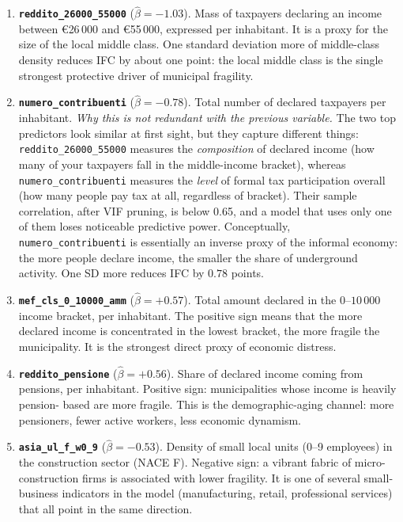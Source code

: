 \documentclass[11pt,a4paper]{article}
\begin{document}
\begin{enumerate}[leftmargin=2em]
  \item \textbf{\texttt{reddito\_26000\_55000}} (\(\hat\beta = -1.03\)).
    Mass of taxpayers declaring an income between
    \euro{26\,000} and \euro{55\,000}, expressed per inhabitant. It
    is a proxy for the size of the local middle class.
    One standard deviation more of middle-class density reduces IFC
    by about one point: the local middle class is the single
    strongest protective driver of municipal fragility.

  \item \textbf{\texttt{numero\_contribuenti}} (\(\hat\beta = -0.78\)).
    Total number of declared taxpayers per inhabitant.
    \emph{Why this is not redundant with the previous variable.} The
    two top predictors look similar at first sight, but they capture
    different things: \texttt{reddito\_26000\_55000} measures the
    \emph{composition} of declared income (how many of your taxpayers
    fall in the middle-income bracket), whereas
    \texttt{numero\_contribuenti} measures the \emph{level} of formal
    tax participation overall (how many people pay tax at all,
    regardless of bracket). Their sample correlation, after VIF
    pruning, is below 0.65, and a model that uses only one of them
    loses noticeable predictive power. Conceptually,
    \texttt{numero\_contribuenti} is essentially an inverse proxy of
    the informal economy: the more people declare income, the smaller
    the share of underground activity. One SD more reduces IFC by
    $0.78$ points.

  \item \textbf{\texttt{mef\_cls\_0\_10000\_amm}} (\(\hat\beta = +0.57\)).
    Total amount declared in the
    \texteuro\(0\)--\texteuro\(10\,000\) income bracket, per
    inhabitant. The positive sign means that the more declared
    income is concentrated in the lowest bracket, the more fragile
    the municipality. It is the strongest direct proxy of economic
    distress.

  \item \textbf{\texttt{reddito\_pensione}} (\(\hat\beta = +0.56\)).
    Share of declared income coming from pensions, per inhabitant.
    Positive sign: municipalities whose income is heavily pension-
    based are more fragile. This is the demographic-aging channel:
    more pensioners, fewer active workers, less economic dynamism.

  \item \textbf{\texttt{asia\_ul\_f\_w0\_9}} (\(\hat\beta = -0.53\)).
    Density of small local units (0--9 employees) in the
    construction sector (NACE F). Negative sign: a vibrant fabric
    of micro-construction firms is associated with lower fragility.
    It is one of several small-business indicators in the model
    (manufacturing, retail, professional services) that all point
    in the same direction.
\end{enumerate}
\end{document}
